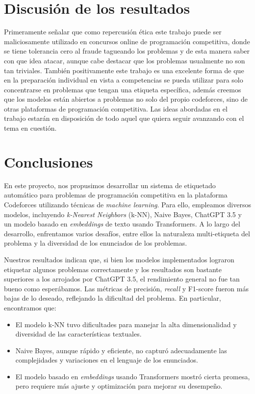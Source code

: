 \documentclass{article}
\begin{document}
\section{Discusión de los resultados}
Primeramente señalar que como repercusión ética este trabajo puede ser maliciosamente utilizado en concursos online de 
programación competitiva, donde se tiene tolerancia cero al fraude tagueando los problemas 
y de esta manera saber con que idea atacar, aunque cabe destacar que los problemas usualmente no son tan triviales. También positivamente este trabajo es una excelente forma de que en la preparación individual en vista a competencias se pueda utilizar para solo concentrarse en problemas que tengan una etiqueta específica, además creemos que los modelos están abiertos a problemas no solo del propio codeforces, sino de otras plataformas de programación competitiva. Las ideas abordadas en el trabajo
estarán en disposición de todo aquel que quiera seguir avanzando con el tema en cuestión.

\section{Conclusiones}

En este proyecto, nos propusimos desarrollar un sistema de etiquetado automático para problemas de programación competitiva en la plataforma Codeforces utilizando técnicas de \textit{machine learning}. Para ello, empleamos diversos modelos, incluyendo \textit{k-Nearest Neighbors} (k-NN), Naive Bayes, ChatGPT 3.5 y un modelo basado en \textit{embeddings} de texto usando Transformers. A lo largo del desarrollo, enfrentamos varios desafíos, entre ellos la naturaleza multi-etiqueta del problema y la diversidad de los enunciados de los problemas.

Nuestros resultados indican que, si bien los modelos implementados lograron etiquetar algunos problemas correctamente y los resultados son bastante superiores a los arrojados por ChatGPT 3.5, el rendimiento general no fue tan bueno como esperábamos. Las métricas de precisión, \textit{recall} y F1-score fueron más bajas de lo deseado, reflejando la dificultad del problema. En particular, encontramos que:

\begin{itemize}
    \item El modelo k-NN tuvo dificultades para manejar la alta dimensionalidad y diversidad de las características textuales.
    \item Naive Bayes, aunque rápido y eficiente, no capturó adecuadamente las complejidades y variaciones en el lenguaje de los enunciados.
    \item El modelo basado en \textit{embeddings} usando Transformers mostró cierta promesa, pero requiere más ajuste y optimización para mejorar su desempeño.
\end{itemize}
\end{document}
